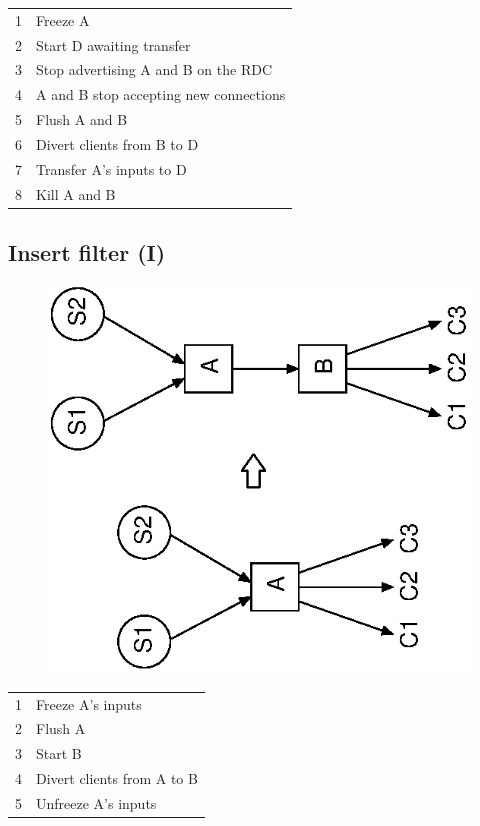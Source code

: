 \documentclass[12pt,a4paper,twoside]{article}
\renewcommand{\_}{\texttt{\symbol{95}}}
\begin{document}
\begin{tabular}{ll}
1 & Freeze A\\
2 & Start D awaiting transfer\\
3 & Stop advertising A and B on the RDC\\
4 & A and B stop accepting new connections\\
5 & Flush A and B\\
6 & Divert clients from B to D\\
7 & Transfer A's inputs to D\\
8 & Kill A and B\\
\end{tabular}

\subsection{Insert filter (I)}

\begin{figure}[h]
\centering
\includegraphics[scale=1.0,angle=-90]{diagrams/insert1.eps}
\end{figure}

\begin{tabular}{ll}
1 & Freeze A's inputs\\
2 & Flush A\\
3 & Start B\\
4 & Divert clients from A to B\\
5 & Unfreeze A's inputs\\
\end{tabular}
\end{document}
